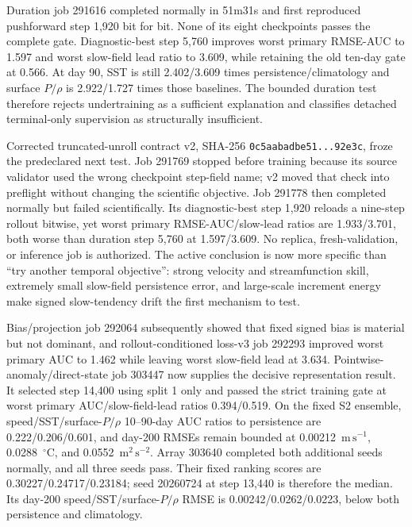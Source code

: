 \documentclass[11pt]{article}
\begin{document}
Duration job 291616 completed normally in 51m31s and first reproduced pushforward
step 1,920 bit for bit.  None of its eight checkpoints passes the complete gate.
Diagnostic-best step 5,760 improves worst primary RMSE-AUC to 1.597 and worst
slow-field lead ratio to 3.609, while retaining the old ten-day gate at 0.566.
At day 90, SST is still 2.402/3.609 times persistence/climatology and surface
\(P/\rho\) is 2.922/1.727 times those baselines.  The bounded duration test therefore
rejects undertraining as a sufficient explanation and classifies detached
terminal-only supervision as structurally insufficient.

Corrected truncated-unroll contract v2, SHA-256
\texttt{0c5aabadbe51...92e3c}, froze the predeclared next test.  Job 291769 stopped
before training because its source validator used the wrong checkpoint step-field
name; v2 moved that check into preflight without changing the scientific objective.
Job 291778 then completed normally but failed scientifically.  Its diagnostic-best
step 1,920 reloads a nine-step rollout bitwise, yet worst primary RMSE-AUC/slow-lead
ratios are 1.933/3.701, both worse than duration step 5,760 at 1.597/3.609.
No replica, fresh-validation, or inference job is authorized.  The active conclusion
is now more specific than ``try another temporal objective'': strong velocity and
streamfunction skill, extremely small slow-field persistence error, and large-scale
increment energy make signed slow-tendency drift the first mechanism to test.

Bias/projection job 292064 subsequently showed that fixed signed bias is material but
not dominant, and rollout-conditioned loss-v3 job 292293 improved worst primary AUC
to 1.462 while leaving worst slow-field lead at 3.634.  Pointwise-anomaly/direct-state
job 303447 now supplies the decisive representation result.  It selected step 14,400
using split 1 only and passed the strict training gate at worst primary
AUC/slow-field-lead ratios 0.394/0.519.  On the fixed S2 ensemble,
speed/SST/surface-\(P/\rho\) 10--90-day AUC ratios to persistence are
0.222/0.206/0.601, and day-200 RMSEs remain bounded at
0.00212~\(\mathrm{m\,s^{-1}}\), 0.0288~\({}^{\circ}\mathrm{C}\), and
0.0552~\(\mathrm{m^2\,s^{-2}}\).  Array 303640 completed both additional seeds
normally, and all three seeds pass.  Their fixed ranking scores are
0.30227/0.24717/0.23184; seed 20260724 at step 13,440 is therefore the median.
Its day-200 speed/SST/surface-\(P/\rho\) RMSE is
0.00242/0.0262/0.0223, below both persistence and climatology.
\end{document}
